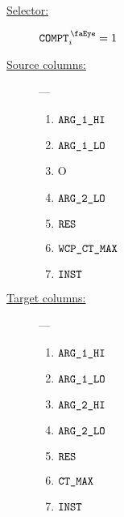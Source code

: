 \begin{description}
	\item[\underline{Selector:}] $\isRlpUtilsCompt_{i} = 1$
	\item[\underline{Source columns:}] ---
		\begin{multicols}{4}
			\begin{enumerate}
				\item $\texttt{ARG}\texttt{\_1}\texttt{\_HI}$
				\item $\texttt{ARG}\texttt{\_1}\texttt{\_LO}$
				\item O
				\item $\texttt{ARG}\texttt{\_2}\texttt{\_LO}$
				\item $\texttt{RES}$
				\item $\texttt{WCP\_CT\_MAX}$
				\item $\texttt{INST}$
			\end{enumerate}
		\end{multicols}
	\item[\underline{Target columns:}] ---
		\begin{multicols}{4}
		\begin{enumerate}
			\item $\texttt{ARG}\texttt{\_1}\texttt{\_HI}$
			\item $\texttt{ARG}\texttt{\_1}\texttt{\_LO}$
			\item $\texttt{ARG}\texttt{\_2}\texttt{\_HI}$
			\item $\texttt{ARG}\texttt{\_2}\texttt{\_LO}$
			\item $\texttt{RES}$
			\item $\texttt{CT\_MAX}$
			\item $\texttt{INST}$
		\end{enumerate}
		\end{multicols}
\end{description}